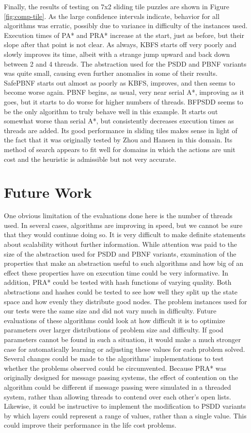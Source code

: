 \documentclass{article}
\begin{document}
Finally, the results of testing on 7x2 sliding tile puzzles are shown in Figure \ref{fig:comp-tile}. As the large confidence intervals indicate, behavior for all algorithms was erratic, possibly due to variance in difficulty of the instances used. Execution times of PA* and PRA* increase at the start, just as before, but their slope after that point is not clear. As always, KBFS starts off very poorly and slowly improves its time, albeit with a strange jump upward and back down between 2 and 4 threads. The abstraction used for the PSDD and PBNF variants was quite small, causing even further anomalies in some of their results. SafePBNF starts out almost as poorly as KBFS, improves, and then seems to become worse again. PBNF begins, as usual, very near serial A*, improving as it goes, but it starts to do worse for higher numbers of threads. BFPSDD seems to be the only algorithm to truly behave well in this example. It starts out somewhat worse than serial A*, but consistently decreases execution times as threads are added. Its good performance in sliding tiles makes sense in light of the fact that it was originally tested by Zhou and Hansen in this domain. Its method of search appears to fit well for domains in which the actions are unit cost and the heuristic is admissible but not very accurate.
\section{Future Work}
One obvious limitation of the evaluations done here is the number of threads used. In several cases, algorithms are improving in speed, but we cannot be sure that they would continue doing so. It is very difficult to make definite statements about scalability without further information.
While attention was paid to the size of the abstraction used for PSDD and PBNF variants, examination of the properties that make an abstraction useful to such algorithms and how big of an effect these properties have on execution time could be very informative. In addition, PRA* could be tested with hash functions of varying quality. Both abstractions and hashes could be tested to see how well they split up the state space and how evenly they distribute good nodes.
The problem instances used for our tests were the same size and did not vary much in difficulty. Future evaluations of these algorithms could look at how difficult it is to optimize parameters over larger distributions of problem size and difficulty. If good parameters cannot be found in such a situation, it would make a much stronger case for automatically learning or adjusting these values for each problem solved.
Several changes could be made to the algorithms' implementations to test whether the problems observed could be circumvented. Because PRA* was originally designed for message passing systems, the effect of contention on the algorithm could be different if message passing were simulated in a threaded system, rather than allowing threads to contend over each other's open lists. Likewise, it could be instructive to implement the modification to PSDD variants by which layers could represent a range of values, rather than a single value. This could improve their performance in the life cost problems.
\end{document}
